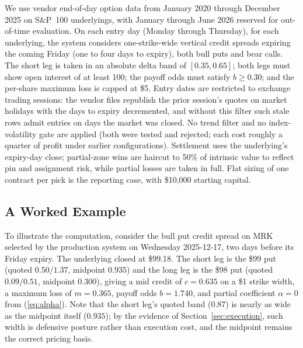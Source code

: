 \documentclass[11pt]{article}
\begin{document}
We use vendor end-of-day option data from January 2020 through December 2025
on S\&P~100 underlyings, with January through June 2026 reserved for
out-of-time evaluation. On each entry day (Monday through Thursday), for each
underlying, the system considers one-strike-wide vertical credit spreads
expiring the coming Friday (one to four days to expiry), both bull puts and
bear calls. The short leg is taken in an absolute delta band of
$[0.35, 0.65]$; both legs must show open interest of at least 100; the payoff
odds must satisfy $b \geq 0.30$; and the per-share maximum loss is capped at
\$5. Entry dates are restricted to exchange trading sessions: the vendor
files republish the prior session's quotes on market holidays with the days
to expiry decremented, and without this filter such stale rows admit entries
on days the market was closed. No trend filter and no index-volatility gate
are applied (both were
tested and rejected; each cost roughly a quarter of profit under earlier
configurations). Settlement uses the underlying's expiry-day close;
partial-zone wins are haircut to 50\% of intrinsic value to reflect pin and
assignment risk, while partial losses are taken in full. Flat sizing of one
contract per pick is the reporting case, with \$10{,}000 starting capital.

\subsection{A Worked Example}
\label{sec:example}

To illustrate the computation, consider the bull put credit spread on MRK
selected by the production system on Wednesday 2025-12-17, two days before
its Friday expiry. The underlying closed at \$99.18. The short leg is the
\$99 put (quoted $0.50 / 1.37$, midpoint $0.935$) and the long leg is the
\$98 put (quoted $0.09 / 0.51$, midpoint $0.300$), giving a mid credit of
$c = 0.635$ on a \$1 strike width, a maximum loss of $m = 0.365$, payoff
odds $b = 1.740$, and partial coefficient $\alpha = 0$ from
(\ref{eq:alpha}). Note that the short leg's quoted band ($0.87$) is nearly
as wide as the midpoint itself ($0.935$); by the evidence of
Section~\ref{sec:execution}, such width is defensive posture rather than
execution cost, and the midpoint remains the correct pricing basis.
\end{document}
